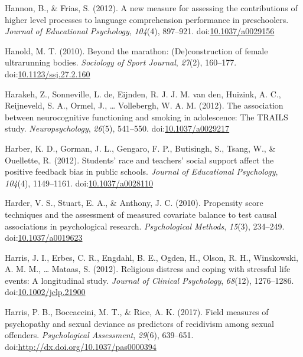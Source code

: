 \documentclass[english,man]{apa6}
\theoremstyle{definition}
\theoremstyle{definition}
\theoremstyle{definition}
\theoremstyle{remark}
\begin{document}
\hypertarget{ref-Hannon2012}{}
Hannon, B., \& Frias, S. (2012). A new measure for assessing the
contributions of higher level processes to language comprehension
performance in preschoolers. \emph{Journal of Educational Psychology},
\emph{104}(4), 897--921.
doi:\href{https://doi.org/10.1037/a0029156}{10.1037/a0029156}

\hypertarget{ref-Hanold2010}{}
Hanold, M. T. (2010). Beyond the marathon: (De)construction of female
ultrarunning bodies. \emph{Sociology of Sport Journal}, \emph{27}(2),
160--177.
doi:\href{https://doi.org/10.1123/ssj.27.2.160}{10.1123/ssj.27.2.160}

\hypertarget{ref-Harakeh2012}{}
Harakeh, Z., Sonneville, L. de, Eijnden, R. J. J. M. van den, Huizink,
A. C., Reijneveld, S. A., Ormel, J., \ldots{} Vollebergh, W. A. M.
(2012). The association between neurocognitive functioning and smoking
in adolescence: The TRAILS study. \emph{Neuropsychology}, \emph{26}(5),
541--550. doi:\href{https://doi.org/10.1037/a0029217}{10.1037/a0029217}

\hypertarget{ref-Harber2012}{}
Harber, K. D., Gorman, J. L., Gengaro, F. P., Butisingh, S., Tsang, W.,
\& Ouellette, R. (2012). Students' race and teachers' social support
affect the positive feedback bias in public schools. \emph{Journal of
Educational Psychology}, \emph{104}(4), 1149--1161.
doi:\href{https://doi.org/10.1037/a0028110}{10.1037/a0028110}

\hypertarget{ref-Harder2010}{}
Harder, V. S., Stuart, E. A., \& Anthony, J. C. (2010). Propensity score
techniques and the assessment of measured covariate balance to test
causal associations in psychological research. \emph{Psychological
Methods}, \emph{15}(3), 234--249.
doi:\href{https://doi.org/10.1037/a0019623}{10.1037/a0019623}

\hypertarget{ref-Harris2012}{}
Harris, J. I., Erbes, C. R., Engdahl, B. E., Ogden, H., Olson, R. H.,
Winskowski, A. M. M., \ldots{} Mataas, S. (2012). Religious distress and
coping with stressful life events: A longitudinal study. \emph{Journal
of Clinical Psychology}, \emph{68}(12), 1276--1286.
doi:\href{https://doi.org/10.1002/jclp.21900}{10.1002/jclp.21900}

\hypertarget{ref-Harris2017}{}
Harris, P. B., Boccaccini, M. T., \& Rice, A. K. (2017). Field measures
of psychopathy and sexual deviance as predictors of recidivism among
sexual offenders. \emph{Psychological Assessment}, \emph{29}(6),
639--651.
doi:\href{https://doi.org/http://dx.doi.org/10.1037/pas0000394}{http://dx.doi.org/10.1037/pas0000394}
\end{document}

